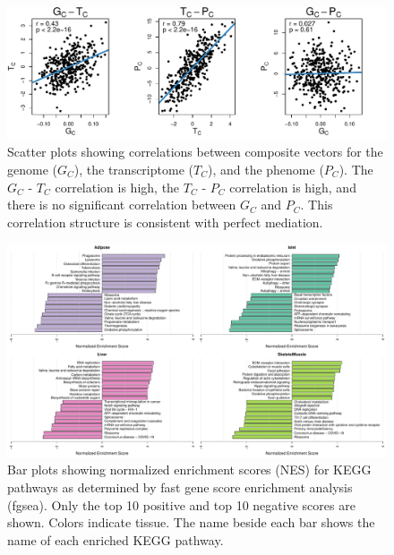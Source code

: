 \documentclass[
]{article}
\begin{document}
\begin{figure}[ht!]
\includegraphics[width=\textwidth]{Figures/Supp_Fig_Composite_Vector_Correlations.pdf} 
\caption{Scatter plots showing correlations between composite vectors 
for the genome ($G_C$), the transcriptome ($T_C$), and the phenome ($P_C$).
The $G_C$ - $T_C$ correlation is high, the $T_C$ - $P_C$ correlation is high,
and there is no significant correlation between $G_C$ and $P_C$. This correlation
structure is consistent with perfect mediation.
}
\label{fig:composite_cor}
\end{figure}

\begin{figure}[ht!]
\includegraphics[width=\textwidth]{Figures/Supp_Fig_enrichments_KEGG.pdf} 
\caption{Bar plots showing normalized enrichment scores (NES) for KEGG 
pathways as determined by fast gene score enrichment analysis (fgsea). 
Only the top 10 positive and top 10 negative scores are shown. Colors 
indicate tissue. The name beside each bar shows the name of each enriched 
KEGG pathway.
}
\label{fig:top_enrich_kegg}
\end{figure}
\end{document}
